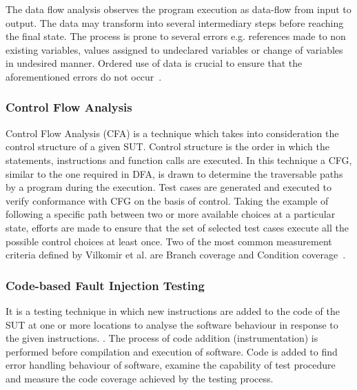 The data flow analysis observes the program execution as data-flow from input to output.
The data may transform into several intermediary steps before reaching the final state. The process is prone to several errors e.g. references made to non existing variables, values assigned to undeclared variables or change of variables in undesired manner. Ordered use of data is crucial to ensure that the aforementioned errors do not occur~\cite{fosdick1976data}.

\subsubsection{Control Flow Analysis}
Control Flow Analysis (CFA) is a technique which takes into consideration the control structure of a given SUT. Control structure is the order in which the statements, instructions and function calls are executed. In this technique a CFG, similar to the one required in DFA, is drawn to determine the traversable paths by a program during the execution. Test cases are generated and executed to verify conformance with CFG on the basis of control. Taking the example of following a specific path between two or more available choices at a particular state, efforts are made to ensure that the set of selected test cases execute all the possible control choices at least once. Two of the most common measurement criteria defined by Vilkomir et al. are Branch coverage and Condition coverage~\cite{vilkomir2003tolerance}. 

\subsubsection{Code-based Fault Injection Testing}
It is a testing technique in which new instructions are added to the code of the SUT at one or more locations to analyse the software behaviour in response to the given instructions. \cite{voas1997software}. The process of code addition (instrumentation) is performed before compilation and execution of software. Code is added to find error handling behaviour of software, examine the capability of test procedure and measure the code coverage achieved by the testing process.    

